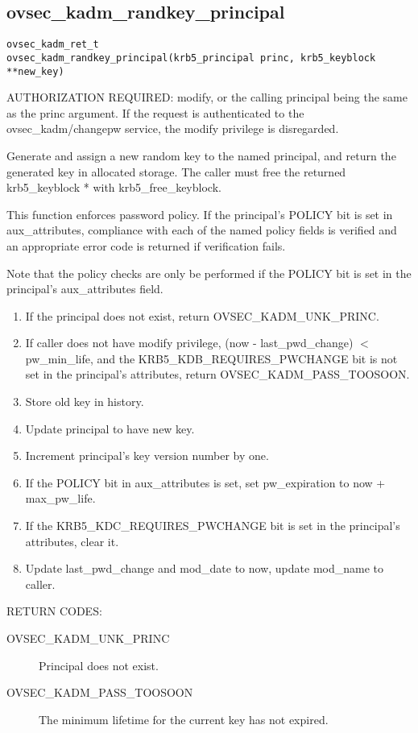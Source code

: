 \subsection{ovsec_kadm_randkey_principal}

\begin{verbatim}
ovsec_kadm_ret_t
ovsec_kadm_randkey_principal(krb5_principal princ, krb5_keyblock **new_key)
\end{verbatim}

AUTHORIZATION REQUIRED: modify, or the calling principal being the
same as the princ argument.  If the request is authenticated to the
ovsec_kadm/changepw service, the modify privilege is disregarded.

Generate and assign a new random key to the named principal, and
return the generated key in allocated storage.  The caller must free
the returned krb5_keyblock * with krb5_free_keyblock.

This function enforces password policy.  If the principal's POLICY bit
is set in aux_attributes, compliance with each of the named policy
fields is verified and an appropriate error code is returned if
verification fails.

Note that the policy checks are only be performed if the POLICY bit is
set in the principal's aux_attributes field.

\begin{enumerate}
\item If the principal does not exist, return OVSEC_KADM_UNK_PRINC.
\item If caller does not have modify privilege, (now - last_pwd_change) $<$
pw_min_life, and the KRB5_KDB_REQUIRES_PWCHANGE bit is not set in the
principal's attributes, return OVSEC_KADM_PASS_TOOSOON.
\item Store old key in history.
\item Update principal to have new key.
\item Increment principal's key version number by one.
\item If the POLICY bit in aux_attributes is set, set pw_expiration to
now + max_pw_life.
\item If the KRB5_KDC_REQUIRES_PWCHANGE bit is set in the principal's
attributes, clear it.
\item Update last_pwd_change and mod_date to now, update mod_name to
caller.
\end{enumerate}

RETURN CODES:

\begin{description}
\item[OVSEC_KADM_UNK_PRINC] Principal does not exist.
\item[OVSEC_KADM_PASS_TOOSOON] The minimum lifetime for the current
key has not expired.
\end{description}

